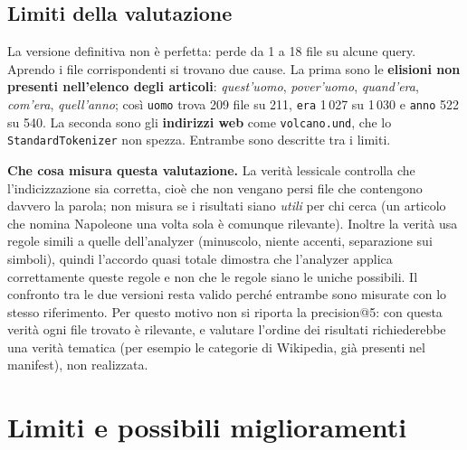 \documentclass[11pt,a4paper]{article}
\newcommand{\code}[1]{\texttt{#1}}
\begin{document}
\subsection{Limiti della valutazione}

La versione definitiva non è perfetta: perde da 1 a 18 file su alcune query. Aprendo
i file corrispondenti si trovano due cause. La prima sono le \textbf{elisioni non
presenti nell'elenco degli articoli}: \emph{quest'uomo}, \emph{pover'uomo},
\emph{quand'era}, \emph{com'era}, \emph{quell'anno}; così \code{uomo} trova 209 file
su 211, \code{era} 1\,027 su 1\,030 e \code{anno} 522 su 540. La seconda sono gli
\textbf{indirizzi web} come \code{volcano.und}, che lo \code{StandardTokenizer} non
spezza. Entrambe sono descritte tra i limiti.

\textbf{Che cosa misura questa valutazione.} La verità lessicale controlla che
l'indicizzazione sia corretta, cioè che non vengano persi file che contengono
davvero la parola; non misura se i risultati siano \emph{utili} per chi cerca (un
articolo che nomina Napoleone una volta sola è comunque rilevante). Inoltre la verità
usa regole simili a quelle dell'analyzer (minuscolo, niente accenti, separazione sui
simboli), quindi l'accordo quasi totale dimostra che l'analyzer applica
correttamente queste regole e non che le regole siano le uniche possibili. Il
confronto tra le due versioni resta valido perché entrambe sono misurate con lo
stesso riferimento. Per questo motivo non si riporta la precision@5: con questa
verità ogni file trovato è rilevante, e valutare l'ordine dei risultati richiederebbe
una verità tematica (per esempio le categorie di Wikipedia, già presenti nel
manifest), non realizzata.

\section{Limiti e possibili miglioramenti}
\label{sec:limiti}
\end{document}
